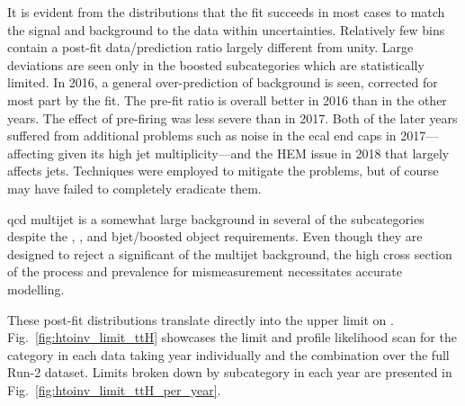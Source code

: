 It is evident from the distributions that the fit succeeds in most cases to match the signal and background to the data within uncertainties. Relatively few bins contain a post-fit data/prediction ratio largely different from unity. Large deviations are seen only in the \ttH boosted subcategories which are statistically limited. In 2016, a general over-prediction of background is seen, corrected for most part by the fit. The pre-fit ratio is overall better in 2016 than in the other years. The effect of pre-firing was less severe than in 2017. Both of the later years suffered from additional problems such as noise in the \acrshort{ecal} end caps in 2017---affecting \ttH given its high jet multiplicity---and the HEM issue in 2018 that largely affects \glspl{jet}. Techniques were employed to mitigate the problems, but of course may have failed to completely eradicate them.

\acrshort{qcd} multijet is a somewhat large background in several of the subcategories despite the \mindphi, \omegaTilde, and \gls{bjet}/boosted object requirements. Even though they are designed to reject a significant of the multijet background, the high cross section of the process and prevalence for mismeasurement necessitates accurate modelling.

These post-fit distributions translate directly into the upper limit on \BRHinvFull. Fig.~\ref{fig:htoinv_limit_ttH} showcases the limit and profile likelihood scan for the \ttH category in each data taking year individually and the combination over the full Run-2 dataset. Limits broken down by subcategory in each year are presented in Fig.~\ref{fig:htoinv_limit_ttH_per_year}.


